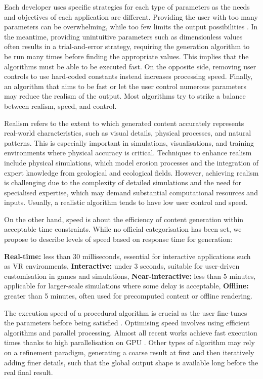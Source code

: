 Each developer uses specific strategies for each type of parameters as the needs and objectives of each application are different. Providing the user with too many parameters can be overwhelming, while too few limits the output possibilities \cite{Togelius2013}. In the meantime, providing unintuitive parameters such as dimensionless values often results in a trial-and-error strategy, requiring the generation algorithm to be run many times before finding the appropriate values. This implies that the algorithms must be able to be executed fast. On the opposite side, removing user controls to use hard-coded constants instead increases processing speed. Finally, an algorithm that aims to be fast or let the user control numerous parameters may reduce the realism of the output. Most algorithms try to strike a balance between realism, speed, and control.

Realism refers to the extent to which generated content accurately represents real-world characteristics, such as visual details, physical processes, and natural patterns. This is especially important in simulations, visualisations, and training environments where physical accuracy is critical. Techniques to enhance realism include physical simulations, which model erosion processes and the integration of expert knowledge from geological and ecological fields. However, achieving realism is challenging due to the complexity of detailed simulations and the need for specialised expertise, which may demand substantial computational resources and inputs. Usually, a realistic algorithm tends to have low user control and speed.

On the other hand, speed is about the efficiency of content generation within acceptable time constraints. While no official categorisation has been set, we propose to describe levels of speed based on response time for generation:
\begin{Itemize}
    \Item{} \textbf{Real-time:} less than 30 milliseconds, essential for interactive applications such as VR environments,
    \Item{} \textbf{Interactive:} under 3 seconds, suitable for user-driven customisation in games and simulations,
    \Item{} \textbf{Near-interactive:} less than 5 minutes, applicable for larger-scale simulations where some delay is acceptable,
    \Item{} \textbf{Offline:} greater than 5 minutes, often used for precomputed content or offline rendering.
\end{Itemize}

The execution speed of a procedural algorithm is crucial as the user fine-tunes the parameters before being satisfied \cite{Smelik2014}.
Optimising speed involves using efficient algorithms and parallel processing. Almost all recent works achieve fast execution times thanks to high parallelisation on GPU \cite{Olsen2004}. Other types of algorithm may rely on a refinement paradigm, generating a coarse result at first and then iteratively adding finer details, such that the global output shape is available long before the real final result.


